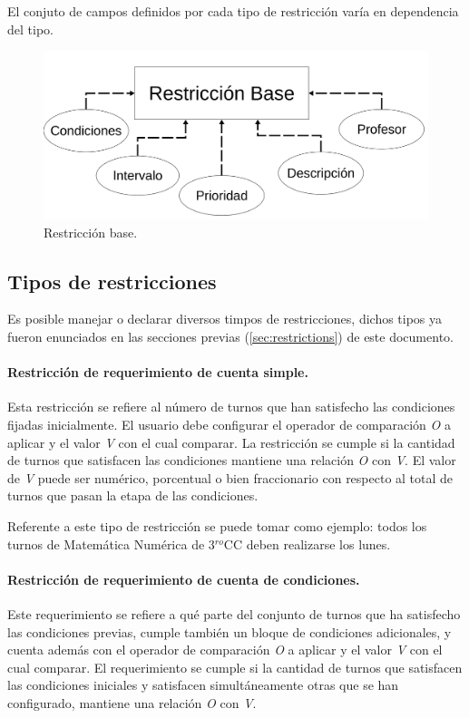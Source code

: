 El conjuto de campos definidos por cada tipo de restricción varía en dependencia del tipo.

\begin{figure}[h]
	\centering
	\includegraphics[width=0.75\linewidth]{images/Chapter 2/base_restrictions}
	\caption{Restricción base.}
	\label{fig:base_restrictions}
\end{figure}

\subsection{Tipos de restricciones}

Es posible manejar o declarar diversos timpos de restricciones, dichos tipos ya fueron enunciados en las secciones previas (\ref{sec:restrictions}) de este documento.

\paragraph{Restricción de requerimiento de cuenta simple.}  Esta restricción se refiere al número de turnos que han satisfecho las condiciones fijadas inicialmente. El usuario debe configurar el operador de comparación \textit{O} a aplicar y el valor \textit{V} con el cual comparar. La restricción se cumple si la cantidad de turnos que satisfacen las condiciones mantiene una relación \textit{O} con \textit{V}. El valor de \textit{V} puede ser numérico, porcentual o bien fraccionario  con respecto al total de turnos que pasan la etapa de las condiciones.
 
Referente a este tipo de restricción se puede tomar como ejemplo: todos los turnos de Matemática Numérica de 3$^{ro}$CC deben realizarse los lunes. 
 

\paragraph{Restricción de requerimiento de cuenta de condiciones.} Este requerimiento se refiere a qué parte del conjunto de turnos que ha satisfecho las condiciones previas, cumple también un bloque de condiciones adicionales, y cuenta además con el operador de comparación \textit{O} a aplicar y el valor \textit{V} con el cual comparar. El requerimiento se cumple si la cantidad de turnos que satisfacen las condiciones iniciales y satisfacen simultáneamente otras que se han configurado, mantiene una relación \textit{O} con \textit{V}.

